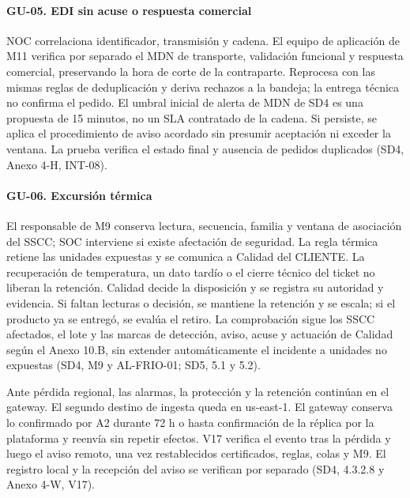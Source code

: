 \Needspace{0.19\textheight}
\paragraph*{GU-05. EDI sin acuse o respuesta comercial}
NOC correlaciona identificador, transmisión y cadena. El equipo de aplicación de M11 verifica por separado el MDN de transporte, validación funcional y respuesta comercial, preservando la hora de corte de la contraparte. Reprocesa con las mismas reglas de deduplicación y deriva rechazos a la bandeja; la entrega técnica no confirma el pedido. El umbral inicial de alerta de MDN de SD4 es una propuesta de 15 minutos, no un SLA contratado de la cadena. Si persiste, se aplica el procedimiento de aviso acordado sin presumir aceptación ni exceder la ventana. La prueba verifica el estado final y ausencia de pedidos duplicados (SD4, Anexo 4-H, INT-08).

\Needspace{0.19\textheight}
\paragraph*{GU-06. Excursión térmica}
El responsable de M9 conserva lectura, secuencia, familia y ventana de asociación del SSCC; SOC interviene si existe afectación de seguridad. La regla térmica retiene las unidades expuestas y se comunica a Calidad del CLIENTE. La recuperación de temperatura, un dato tardío o el cierre técnico del ticket no liberan la retención. Calidad decide la disposición y se registra su autoridad y evidencia. Si faltan lecturas o decisión, se mantiene la retención y se escala; si el producto ya se entregó, se evalúa el retiro. La comprobación sigue los SSCC afectados, el lote y las marcas de detección, aviso, acuse y actuación de Calidad según el Anexo 10.B, sin extender automáticamente el incidente a unidades no expuestas (SD4, M9 y AL-FRIO-01; SD5, 5.1 y 5.2).

Ante pérdida regional, las alarmas, la protección y la retención continúan en el gateway. El segundo destino de ingesta queda en us-east-1. El gateway conserva lo confirmado por A2 durante 72 h o hasta confirmación de la réplica por la plataforma y reenvía sin repetir efectos. V17 verifica el evento tras la pérdida y luego el aviso remoto, una vez restablecidos certificados, reglas, colas y M9. El registro local y la recepción del aviso se verifican por separado (SD4, 4.3.2.8 y Anexo 4-W, V17).

\Needspace{0.19\textheight}

